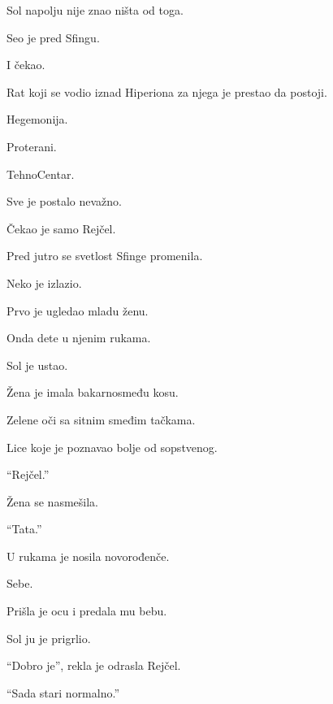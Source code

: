 \bigskip

Sol napolju nije znao ništa od toga.

\bigskip

Seo je pred Sfingu.

I čekao.

\bigskip

Rat koji se vodio iznad Hiperiona za njega je prestao da postoji.

Hegemonija.

Proterani.

TehnoCentar.

Sve je postalo nevažno.

\bigskip

Čekao je samo Rejčel.

\bigskip

Pred jutro se svetlost Sfinge promenila.

\bigskip

Neko je izlazio.

\bigskip

Prvo je ugledao mladu ženu.

Onda dete u njenim rukama.

\bigskip

Sol je ustao.

\bigskip

Žena je imala bakarnosmeđu kosu.

Zelene oči sa sitnim smeđim tačkama.

Lice koje je poznavao bolje od sopstvenog.

\bigskip

``Rejčel.''

\bigskip

Žena se nasmešila.

\bigskip

``Tata.''

\bigskip

U rukama je nosila novorođenče.

\bigskip

Sebe.

\bigskip

Prišla je ocu i predala mu bebu.

\bigskip

Sol ju je prigrlio.

\bigskip

``Dobro je'', rekla je odrasla Rejčel.

``Sada stari normalno.''

\bigskip


